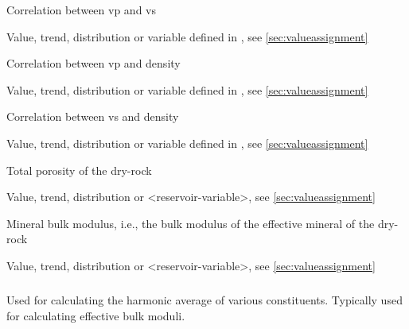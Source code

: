 {
 \slist
   \item \Description Correlation between vp and vs
   \item \Argument Value, trend, distribution or variable defined in , see \autoref{sec:valueassignment}
   \item {}
 \elist

 \slist
   \item \Description Correlation between vp and density
   \item \Argument Value, trend, distribution or variable defined in , see \autoref{sec:valueassignment}
   \item {}
 \elist

 \slist
   \item \Description Correlation between vs and density
   \item \Argument Value, trend, distribution or variable defined in , see \autoref{sec:valueassignment}
   \item {}
 \elist

 \slist
   \item \Description Total porosity of the dry-rock
   \item \Argument Value, trend, distribution or <reservoir-variable>, see \autoref{sec:valueassignment}
   \item \Default 
 \elist

 \slist
   \item \Description Mineral bulk modulus, i.e., the bulk modulus of the effective mineral of the dry-rock
   \item \Argument Value, trend, distribution or <reservoir-variable>, see \autoref{sec:valueassignment}
   \item \Default 
 \elist

\subparagraph{}
 \slist
   \item \Description Used for calculating the harmonic average of various constituents. Typically used for calculating effective bulk moduli. 
   \item \Argument
   \item \Default 
 \elist

}
